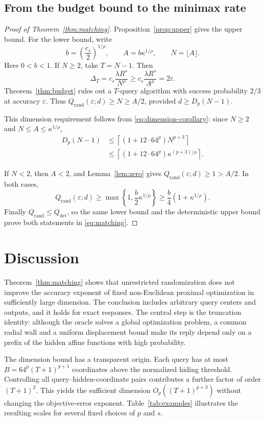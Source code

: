 \documentclass[11pt]{article}
\theoremstyle{definition}
\theoremstyle{remark}
\newcommand{\eps}{\varepsilon}
\newcommand{\Qrand}{Q_{\mathrm{rand}}}
\newcommand{\Qdet}{Q_{\mathrm{det}}}
\begin{document}
\subsection{From the budget bound to the minimax rate}

\begin{proof}[Proof of Theorem~\ref{thm:matching}]
Proposition~\ref{prop:upper} gives the upper bound. For the lower bound, write
\[
b=\left(\frac{c_s}{2}\right)^{1/\rho},
\qquad A=b\kappa^{1/\rho},
\qquad N=\lfloor A\rfloor.
\]
Here $0<b<1$. If $N\ge2$, take $T=N-1$. Then
\[
\Delta_T=c_s\frac{\lambda R^s}{N^\rho}
\ge c_s\frac{\lambda R^s}{A^\rho}=2\eps.
\]
Theorem~\ref{thm:budget} rules out a $T$-query algorithm with success
probability $2/3$ at accuracy $\eps$. Thus
$\Qrand(\eps;d)\ge N\ge A/2$, provided $d\ge D_p(N-1)$.

This dimension requirement follows from \eqref{eq:dimension-corollary}:
since $N\ge2$ and $N\le A\le\kappa^{1/\rho}$,
\begin{align*}
D_p(N-1)
&\le \left\lceil(1+12\cdot64^p)N^{p+3}\right\rceil\\
&\le \left\lceil(1+12\cdot64^p)\kappa^{(p+3)/\rho}\right\rceil.
\end{align*}

If $N<2$, then $A<2$, and Lemma~\ref{lem:zero} gives
$\Qrand(\eps;d)\ge1>A/2$. In both cases,
\[
\Qrand(\eps;d)
\ge\max\left\{1,\frac b2\kappa^{1/\rho}\right\}
\ge\frac b4\left(1+\kappa^{1/\rho}\right).
\]
Finally $\Qrand\le \Qdet$, so the same lower bound and the
deterministic upper bound prove both statements in \eqref{eq:matching}.
\end{proof}

\section{Discussion}\label{sec:discussion}

Theorem~\ref{thm:matching} shows that unrestricted randomization does
not improve the accuracy exponent of fixed non-Euclidean proximal
optimization in sufficiently large dimension. The conclusion includes
arbitrary query centers and outputs, and it holds for exact responses.
The central step is the truncation identity: although the oracle solves
a global optimization problem, a common radial wall and a uniform
displacement bound make its reply depend only on a prefix of the hidden
affine functions with high probability.

The dimension bound has a transparent origin. Each query has at most
$B=64^p(T+1)^{p+1}$ coordinates above the normalized hiding threshold.
Controlling all query--hidden-coordinate pairs contributes a further
factor of order $(T+1)^2$. This yields the sufficient dimension
$O_p((T+1)^{p+3})$ without changing the objective-error exponent.
Table~\ref{tab:examples} illustrates the resulting scales for several
fixed choices of $p$ and $s$.
\end{document}

